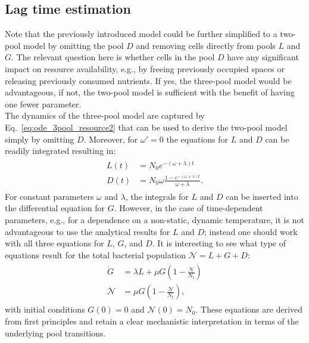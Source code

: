 \documentclass[10pt,1p,authoryear]{elsarticle}
\numberwithin{equation}{section}
\begin{document}
\subsection{Lag time estimation}
Note that the previously introduced model could be further simplified to a two-pool model by omitting the pool $D$ and removing cells directly from pools $L$ and $G$.
The relevant question here is whether cells in the pool $D$ have any significant impact on resource availability, e.g., by freeing previously occupied spaces or releasing previously consumed nutrients.
If yes, the three-pool model would be advantageous, if not, the two-pool model is sufficient with the benefit of having one fewer parameter.\\
%
The dynamics of the three-pool model are captured by Eq.~\eqref{eq:ode_3pool_resource2} that can be used to derive the two-pool model simply by omitting $D$.
Moreover, for $\omega'=0$ the equations for $L$ and $D$ can be readily integrated resulting in:
\begin{align}
    \begin{split}
        L(t) &= N_0 e^{-(\omega+\lambda)t}\\
        D(t) &= N_0 \omega \frac{1-e^{-(\omega+\lambda)t}}{\omega+\lambda
       }.
    \end{split}
\end{align}
For constant parameters $\omega$ and $\lambda$, the integrals for $L$ and $D$ can be inserted into the differential equation for $G$.
However, in the case of time-dependent parameters, e.g., for a dependence on a non-static, dynamic temperature, it is not advantageous to use the analytical results for $L$ and $D$; instead one should work with all three equations for $L$, $G$, and $D$.
It is interesting to see what type of equations result for the total bacterial population $\mathcal{N}=L+G+D$:
\begin{align}
    \begin{split}
        \dot{G} &= \lambda L + \mu G\left(1-\frac{\mathcal{N}}{N_t}\right)\\
        \dot{\mathcal{N}} &= \mu G\left(1-\frac{\mathcal{N}}{N_t}\right),
    \end{split}
\end{align}
with initial conditions $G(0)=0$ and $\mathcal{N}(0)=N_0$.
These equations are derived from first principles and retain a clear mechanistic interpretation in terms of the underlying pool transitions.\\
%
\end{document}
